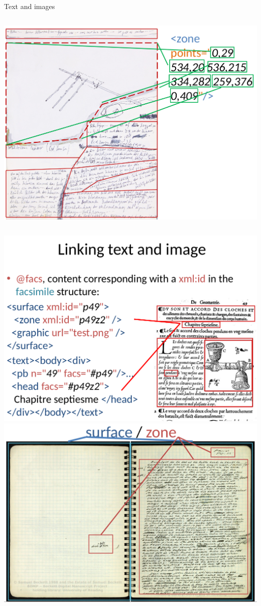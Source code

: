 \begin{frame}{Text and images}
\begin{columns}
\includegraphics[width=\textwidth]{img/facs4.png}
\end{columns}

\framebreak

\begin{columns}

\includegraphics[width=\textwidth]{img/facs5.png}
\includegraphics[width=\textwidth]{img/facs6.png}


\end{columns}
\end{frame}
